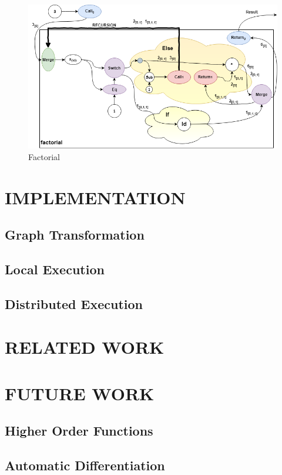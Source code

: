 \documentclass[ack,preface]{dithesis}
\begin{document}
\begin{figure}
\centering
\includegraphics[scale=0.65]{figures/factorial}
\caption{Factorial}
\end{figure}

\chapter{IMPLEMENTATION}
    \section{Graph Transformation}

    \section{Local Execution}

    \section{Distributed Execution}

\chapter{RELATED WORK}

\chapter{FUTURE WORK}
 
   \section{Higher Order Functions}

    \section{Automatic Differentiation}
\end{document}

